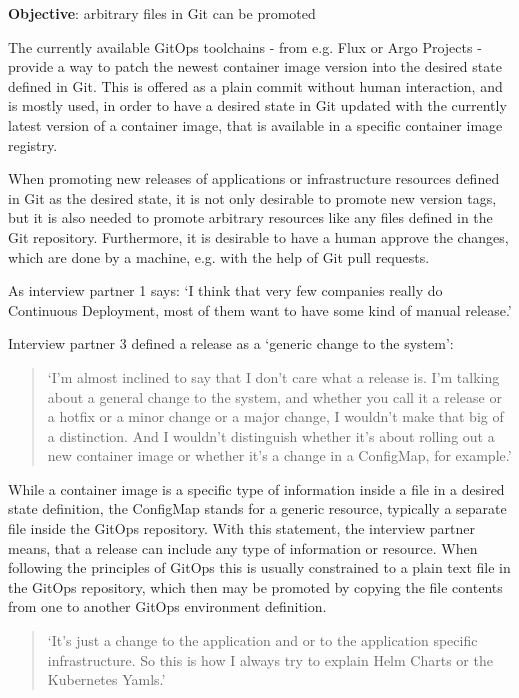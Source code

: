 \textbf{Objective}: arbitrary files in Git can be promoted

The currently available GitOps toolchains -
from e.g. Flux or Argo Projects -
provide a way to patch the newest container image version
into the desired state defined in Git.
This is offered as a plain commit without human interaction,
and is mostly used, in order to have a desired state in Git updated with
the currently latest version of a container image,
that is available in a specific container image registry.

When promoting new releases of applications or infrastructure resources defined in Git as the 
desired state, it is not only desirable to promote new version tags,
but it is also needed to promote arbitrary resources like any files
defined in the Git repository.
Furthermore, it is desirable to have a human approve the changes,
which are done by a machine, e.g. with the help of Git pull requests.

As interview partner 1 says:
\enquote*{I think that very few companies really do Continuous Deployment, most of them want to have some kind of manual release.}

Interview partner 3 defined a release
as a \enquote*{generic change to the system}:

\begin{quotation}
	\noindent
	\enquote*{I'm almost inclined to say that I don't care what a release is. I'm talking about a general change to the system, and whether you call it a release or a hotfix or a minor change or a major change, I wouldn't make that big of a distinction. And I wouldn't distinguish whether it's about rolling out a new container image or whether it's a change in a ConfigMap, for example.}
\end{quotation}

While a container image is a specific type of information inside a file in a desired state definition,
the ConfigMap stands for a generic resource, typically a separate file inside the GitOps repository.
With this statement, the interview partner means, that a release can include any type of information
or resource. When following the principles of GitOps this is usually constrained to a plain text
file in the GitOps repository, which then may be promoted by copying the file contents from
one to another GitOps environment definition.

\begin{quotation}
	\noindent
	\enquote*{It's just a change to the application and or to the application specific infrastructure. So this is how I always try to explain Helm Charts or the Kubernetes Yamls.}
\end{quotation}

